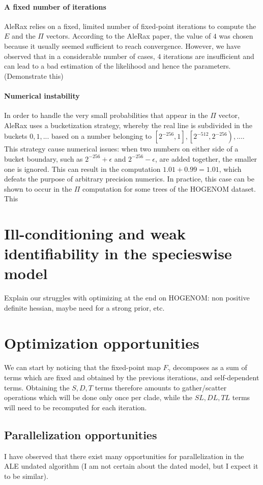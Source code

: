 \documentclass{article}
\newcommand{\1}{\mathbf{1}}
\begin{document}
\paragraph{A fixed number of iterations}
AleRax relies on a fixed, limited number of fixed-point iterations to compute the $E$ and the $\Pi$ vectors. According to the AleRax paper, the value of $4$ was chosen because it usually seemed sufficient to reach convergence. However, we have observed that in a considerable number of cases, $4$ iterations are insufficient and can lead to a bad estimation of the likelihood and hence the parameters. (Demonstrate this)
\paragraph{Numerical instability}
In order to handle the very small probabilities that appear in the $\Pi$ vector, AleRax uses a bucketization strategy, whereby the real line is subdivided in the buckets $0, 1, ...$ based on a number belonging to $\left[2^{-256}, 1\right], \left[2^{-512}, 2^{-256}\right), ...$. This strategy cause numerical issues: when two numbers on either side of a bucket boundary, such as $2^{-256}+\epsilon$ and $2^{-256}-\epsilon$, are added together, the smaller one is ignored. This can result in the computation $1.01+0.99 = 1.01$, which defeats the purpose of arbitrary precision numerics. In practice, this case can be shown to occur in the $\Pi$ computation for some trees of the HOGENOM dataset. This 

\section{Ill-conditioning and weak identifiability in the specieswise model}
Explain our struggles with optimizing at the end on HOGENOM: non positive definite hessian, maybe need for a strong prior, etc.



\section{Optimization opportunities}
We can start by noticing that the fixed-point map $F_\gamma$ decomposes as a sum of terms which are fixed and obtained by the previous iterations, and self-dependent terms. Obtaining the $S, D, T$ terms therefore amounts to gather/scatter operations which will be done only once per clade, while the $SL, DL, TL$ terms will need to be recomputed for each iteration.
\subsection{Parallelization opportunities}
I have observed that there exist many opportunities for parallelization in the ALE undated algorithm (I am not certain about the dated model, but I expect it to be similar).
\end{document}

